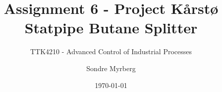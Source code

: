 \documentclass[numbers=noenddot,a4paper]{scrreprt}
\title{Assignment 6 - Project Kårstø Statpipe Butane Splitter}
\subtitle{TTK4210 - Advanced Control of Industrial Processes}
\author{Sondre Myrberg}
\date{\today}
\renewcommand{\thechapter}{\arabic{chapter}}
\renewcommand{\thesection}{\thechapter.\arabic{section}}
\renewcommand{\thefigure}{\thesection.\arabic{figure}}
\numberwithin{equation}{section}
\numberwithin{figure}{section}
\begin{document}
\setcounter{page}{0}
\hypersetup{pageanchor=false}
\begin{titlepage}
    \maketitle
\end{titlepage}
\hypersetup{pageanchor=true}

\tableofcontents
\listoffigures

\clearpage
\setcounter{page}{1}
\renewcommand{\thefigure}{\thechapter.\arabic{figure}}

\renewcommand{\thefigure}{\thesection.\arabic{figure}}
\clearpage

\clearpage

\clearpage

\printbibliography

\appendix
\renewcommand{\thefigure}{\thechapter.\arabic{figure}}

\end{document}

